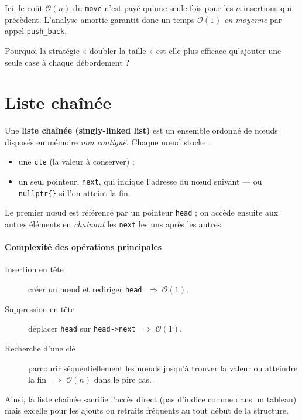 Ici, le coût $\mathcal{O}(n)$ du \texttt{move} n’est payé qu’une seule
fois pour les $n$ insertions qui précèdent.  L’analyse amortie garantit
donc un temps \(\mathcal{O}(1)\) \emph{en moyenne} par appel
\lstinline|push_back|.

\begin{reflexion}
Pourquoi la stratégie « doubler la taille » est-elle plus
efficace qu’ajouter une seule case à chaque débordement ?
\end{reflexion}

\section{Liste chaînée}


Une \textbf{liste chaînée (singly-linked list)} est un ensemble ordonné de
nœuds disposés en mémoire \emph{non contiguë}.
Chaque nœud stocke :

\begin{itemize}
  \item une \lstinline|cle| (la valeur à conserver) ;
  \item un seul pointeur, \lstinline|next|, qui indique l’adresse du nœud
        suivant — ou \lstinline|nullptr{}| si l’on atteint la fin.
\end{itemize}

Le premier nœud est référencé par un pointeur \lstinline|head| ; on
accède ensuite aux autres éléments en \emph{chaînant} les
\lstinline|next| les uns après les autres.

\paragraph{Complexité des opérations principales}
\begin{description}
  \item[Insertion en tête] créer un nœud et rediriger \lstinline|head|
        \(\;\Rightarrow\; \mathcal{O}(1)\).
  \item[Suppression en tête] déplacer \lstinline|head| sur
        \lstinline|head->next| \(\;\Rightarrow\; \mathcal{O}(1)\).
  \item[Recherche d’une clé] parcourir séquentiellement les nœuds
        jusqu’à trouver la valeur ou atteindre la fin
        \(\;\Rightarrow\; \mathcal{O}(n)\) dans le pire cas.
\end{description}

Ainsi, la liste chaînée sacrifie l’accès direct (pas d’indice comme
dans un tableau) mais excelle pour les ajouts ou retraits fréquents
au tout début de la structure.

